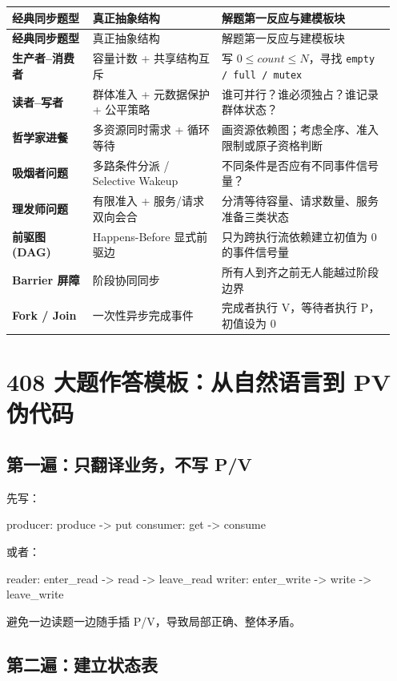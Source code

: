\documentclass[11pt,a4paper]{ctexart}
\newcommand{\code}[1]{\texttt{#1}}
\begin{document}
\begingroup
\small
\renewcommand{\arraystretch}{1.25}
\begin{longtable}{>{\bfseries}p{0.2\linewidth} p{0.32\linewidth} p{0.43\linewidth}}
\toprule
经典同步题型 & 真正抽象结构 & 解题第一反应与建模板块\\
\midrule
\endfirsthead
\toprule
经典同步题型 & 真正抽象结构 & 解题第一反应与建模板块\\
\midrule
\endhead
生产者--消费者 & 容量计数 + 共享结构互斥 & 写 $0\le count\le N$，寻找 \code{empty / full / mutex}\\
读者--写者 & 群体准入 + 元数据保护 + 公平策略 & 谁可并行？谁必须独占？谁记录群体状态？\\
哲学家进餐 & 多资源同时需求 + 循环等待 & 画资源依赖图；考虑全序、准入限制或原子资格判断\\
吸烟者问题 & 多路条件分派 / Selective Wakeup & 不同条件是否应有不同事件信号量？\\
理发师问题 & 有限准入 + 服务/请求双向会合 & 分清等待容量、请求数量、服务准备三类状态\\
前驱图 (DAG) & Happens-Before 显式前驱边 & 只为跨执行流依赖建立初值为 0 的事件信号量\\
Barrier 屏障 & 阶段协同同步 & 所有人到齐之前无人能越过阶段边界\\
Fork / Join & 一次性异步完成事件 & 完成者执行 V，等待者执行 P，初值设为 0\\
\bottomrule
\end{longtable}
\endgroup

\section{408 大题作答模板：从自然语言到 PV 伪代码}

\subsection{第一遍：只翻译业务，不写 P/V}

先写：
\begin{codeblock}
producer: produce -> put
consumer: get -> consume
\end{codeblock}
或者：
\begin{codeblock}
reader: enter_read -> read -> leave_read
writer: enter_write -> write -> leave_write
\end{codeblock}
避免一边读题一边随手插 P/V，导致局部正确、整体矛盾。

\subsection{第二遍：建立状态表}
\end{document}
